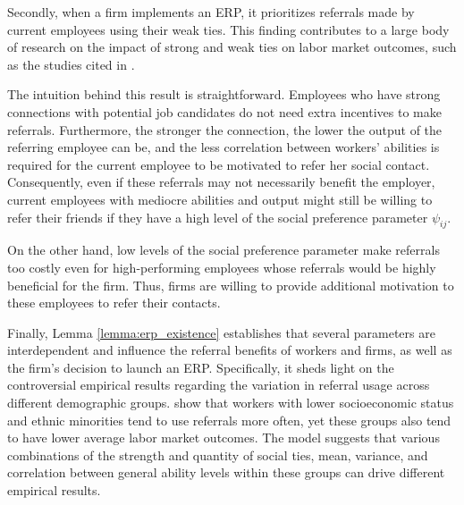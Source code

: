 \documentclass[12pt]{article}
\begin{document}

Secondly, when a firm implements an ERP, it prioritizes referrals made by current employees using their weak ties. This finding contributes to a large body of research on the impact of strong and weak ties on labor market outcomes, such as the studies cited in \cite{lin1981social, montgomery1992job, montgomery1994weak, granovetter1995getting, yakubovich2005weak, lester2021heterogeneous}.

The intuition behind this result is straightforward. Employees who have strong connections with potential job candidates do not need extra incentives to make referrals. Furthermore, the stronger the connection, the lower the output of the referring employee can be, and the less correlation between workers' abilities is required for the current employee to be motivated to refer her social contact. Consequently, even if these referrals may not necessarily benefit the employer, current employees with mediocre abilities and output might still be willing to refer their friends if they have a high level of the social preference parameter $\psi_{ij}$.

On the other hand, low levels of the social preference parameter make referrals too costly even for high-performing employees whose referrals would be highly beneficial for the firm. Thus, firms are willing to provide additional motivation to these employees to refer their contacts. 

Finally, Lemma \ref{lemma:erp_existence} establishes that several parameters are interdependent and influence the referral benefits of workers and firms, as well as the firm's decision to launch an ERP. Specifically, it sheds light on the controversial empirical results regarding the variation in referral usage across different demographic groups. \cite{holzer1987job, calvo2004effects, loury2006some, pellizzari2010friends,  lalanne2021social} show that workers with lower socioeconomic status and ethnic minorities tend to use referrals more often, yet these groups also tend to have lower average labor market outcomes. The model suggests that various combinations of the strength and quantity of social ties, mean, variance, and correlation between general ability levels within these groups can drive different empirical results.
\end{document}
